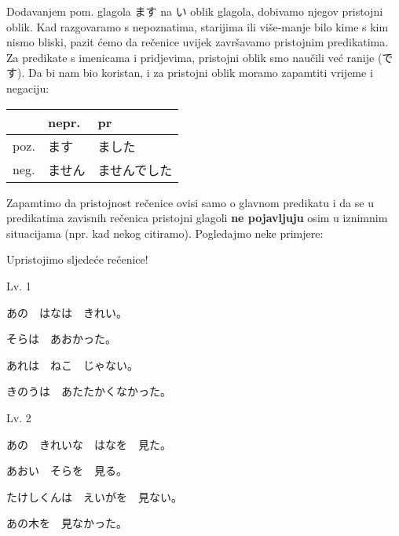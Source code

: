 	
	Dodavanjem pom. glagola ます na い oblik glagola, dobivamo njegov pristojni oblik. Kad razgovaramo s nepoznatima, starijima ili više-manje bilo kime s kim nismo bliski, pazit ćemo da rečenice uvijek završavamo pristojnim predikatima. Za predikate s imenicama i pridjevima, pristojni oblik smo naučili već ranije (です). Da bi nam bio koristan, i za pristojni oblik moramo zapamtiti vrijeme i negaciju:
	
	\begin{table}[h]
		\centering
		\begin{tabular}{l | l l}%
			& nepr. & pr \\
			\midrule
			poz. & ます & ました \\
			neg. & ません & ませんでした \\
		\end{tabular}
	\end{table}

	Zapamtimo da pristojnost rečenice ovisi samo o glavnom predikatu i da se u predikatima zavisnih rečenica pristojni glagoli \textbf{ne pojavljuju} osim u iznimnim situacijama (npr. kad nekog citiramo). Pogledajmo neke primjere:
	
	\begin{reibun}
	\end{reibun}

	
	Upristojimo sljedeće rečenice!
	
	\begin{mondai}{Lv. 1}
		\item あの　はなは　きれい。
		\item そらは　あおかった。
		\item あれは　ねこ　じゃない。
		\item きのうは　あたたかくなかった。
	\end{mondai}

	\begin{mondai}{Lv. 2}
		\item あの　きれいな　はなを　見た。
		\item あおい　そらを　見る。
		\item たけしくんは　えいがを　見ない。
		\item あの木を　見なかった。
	\end{mondai}

